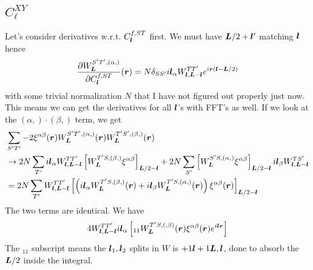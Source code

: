 \documentclass[11pt]{article}
\begin{document}
\subsection{$C_\ell^{XY}$}
Let's consider derivatives w.r.t. $C^{f, ST}_{\boldsymbol{l}}$ first.  We must have $\boldsymbol{L}/2 + \boldsymbol{l}'$ matching $\boldsymbol{l}$ hence
\begin{equation}
	\frac{\partial W_{\boldsymbol{L}}^{S'T', (\alpha,)}}{\partial C_{\boldsymbol{l}}^{f, ST}}(\boldsymbol{r}) = N\delta_{SS'}i\boldsymbol{l}_\alpha W^{TT'}_{\boldsymbol{l}, \boldsymbol{L}-\boldsymbol{l}}e^{i \boldsymbol{r} \left(\boldsymbol{l} - \boldsymbol{L}/2 \right)}
\end{equation}
with some trivial normalization $N$ that I have not figured out properly just now. This means we can get the derivatives for all $\boldsymbol{l}$'s with FFT's as well. 
If we look at the $(\alpha,) \cdot (\beta,)$ term, we get
\begin{equation}
\begin{split}
&\sum_{S'T'} -2 \xi^{\alpha\beta}(\boldsymbol{r})W_{\boldsymbol{L}}^{S'T',(\alpha,)}(\boldsymbol{r})W_{\boldsymbol{L}}^{T'S',(\beta,)}(\boldsymbol{r}) \\ &\rightarrow 2N \sum_{T'} i\boldsymbol{l}_\alpha W^{TT'}_{\boldsymbol{l}, \boldsymbol{L} - \boldsymbol{l}} \left[W_{\boldsymbol{L}}^{T'S, (\beta,)} \xi^{\alpha \beta}\right ]_{\boldsymbol{L}/2 - \boldsymbol{l}}  +2N\sum_{S'}\left[W_{\boldsymbol{L}}^{S'S, (\alpha,)} \xi^{\alpha \beta}\right ]_{\boldsymbol{L}/2 - \boldsymbol{l}}  i\boldsymbol{l}_\beta W^{TS'}_{\boldsymbol{l}, \boldsymbol{L} - \boldsymbol{l}} \\
&= 2 N \sum_{T'} W^{TT'}_{\boldsymbol{l}, \boldsymbol{L} - \boldsymbol{l}} \left[  \left(i\boldsymbol{l}_\alpha W_{\boldsymbol{L}}^{T'S, (\beta,)}(\boldsymbol{r}) + i\boldsymbol{l}_\beta W_{\boldsymbol{L}}^{T'S, (\alpha,)}(\boldsymbol{r}) \right )  \xi^{\alpha \beta}(\boldsymbol{r})\right]_{\boldsymbol{L}/2 - \boldsymbol{l}}
\end{split}
\end{equation}
The two terms are identical. We have
\begin{equation} 
4 W^{TT'}_{\boldsymbol{l}, \boldsymbol{L} - \boldsymbol{l}}	i \boldsymbol{l}_\alpha \left[ _{11}W^{T'S, (,\beta)}_{\boldsymbol{L}}(\boldsymbol{r}) \xi^{\alpha \beta}(\boldsymbol{r}) e^{i \boldsymbol{l} \boldsymbol{r}}\right]
\end{equation}
The $_{11}$ subscript means the $\boldsymbol{l}_1,\boldsymbol{l}_2$ splits in $W$ is $+1\boldsymbol{l} + 1\boldsymbol{L}, \boldsymbol{l} $, done to absorb the $\boldsymbol{L}/2$ inside the integral.
\end{document}
